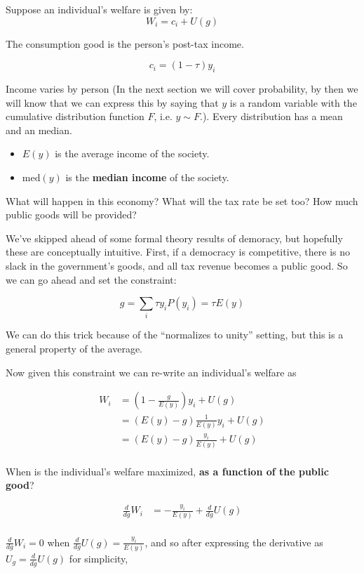 \documentclass[]{book}
\providecommand{\tightlist}{%
  \setlength{\itemsep}{0pt}\setlength{\parskip}{0pt}}
\theoremstyle{definition}
\theoremstyle{definition}
\theoremstyle{definition}
\theoremstyle{remark}
\begin{document}
Suppose an individual's welfare is given by: \[W_i = c_i + U(g)\]

The consumption good is the person's post-tax income.

\[c_i = (1 - \tau) y_i\]

Income varies by person (In the next section we will cover probability,
by then we will know that we can express this by saying that \(y\) is a
random variable with the cumulative distribution function \(F\), i.e.
\(y \sim F\).). Every distribution has a mean and an median.

\begin{itemize}
\tightlist
\item
  \(E(y)\) is the average income of the society.
\item
  \(\text{med}(y)\) is the \textbf{median income} of the society.
\end{itemize}

What will happen in this economy? What will the tax rate be set too? How
much public goods will be provided?

We've skipped ahead of some formal theory results of demoracy, but
hopefully these are conceptually intuitive. First, if a democracy is
competitive, there is no slack in the government's goods, and all tax
revenue becomes a public good. So we can go ahead and set the
constraint:

\[g = \sum_{i} \tau y_i P(y_i) = \tau E(y)\]

We can do this trick because of the ``normalizes to unity'' setting, but
this is a general property of the average.

Now given this constraint we can re-write an individual's welfare as

\begin{align*}
W_i &= \left(1 - \frac{g}{E(y)}\right)y_i + U(g)\\
&= \left(E(y) - g\right) \frac{1}{E(y)} y_i + U(g)\\
&= \left(E(y) - g\right) \frac{y_i}{E(y)} + U(g)\\
\end{align*}

When is the individual's welfare maximized, \textbf{as a function of the
public good}?

\begin{align*}
\frac{d}{dg}W_i &=  - \frac{y_i}{E(y)} + \frac{d}{dg}U(g)\\
\end{align*}

\(\frac{d}{dg}W_i = 0\) when \(\frac{d}{dg}U(g) = \frac{y_i}{E(y)}\),
and so after expressing the derivative as \(U_g = \frac{d}{dg}U(g)\) for
simplicity,
\end{document}
